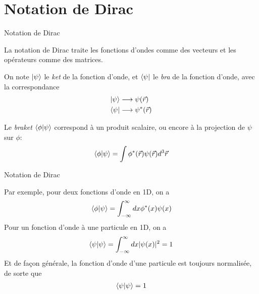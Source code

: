 \documentclass[xcolor=svgnames,t,aspectratio=169,handout]{uqtrcours}
\begin{document}
\section{Notation de Dirac}
\frame{\sectionpage}







\begin{frame}{Notation de Dirac}

La notation de Dirac traite les fonctions d'ondes comme des
  vecteurs et les opérateurs comme des matrices.

\medskip

On note $\ket{\psi}$ le \textit{ket} de la fonction d'onde,
  et $\bra{\psi}$ le \textit{bra} de la fonction d'onde,
  avec la correspondance
\begin{align}
  \ket{\psi} & \longrightarrow \psi(\vec r) \nonumber\\
  \bra{\psi} & \longrightarrow \psi^*(\vec r)
\end{align}


Le \textit{braket} $\braket{\phi \vert \psi}$
  correspond à un produit scalaire,
  ou encore à la projection de $\psi$ sur $\phi$:
%
\begin{align}
  \braket{\phi \vert \psi}
  =
  \int
  \phi^*(\vec r)
  \psi(\vec r)
  d^3 \vec r
\end{align}

\end{frame}


\begin{frame}{Notation de Dirac}

Par exemple, pour deux fonctions d'onde en 1D, on a
\begin{align}
  \braket{\phi \vert \psi}
  =
  \int_{-\infty}^{\infty}
  dx
  \phi^*(x)
  \psi(x)
\end{align}
%
Pour un fonction d'onde à une particule en 1D, on a
\begin{align}
  \braket{\psi \vert \psi}
  =
  \int_{-\infty}^{\infty}
  dx \vert \psi(x) \vert^2
  = 1
\end{align}
%
Et de façon générale,
  la fonction d'onde d'une particule
  est toujours normalisée,
  de sorte que
\begin{align}
  \braket{\psi \vert \psi} = 1
\end{align}

\end{frame}
\end{document}
